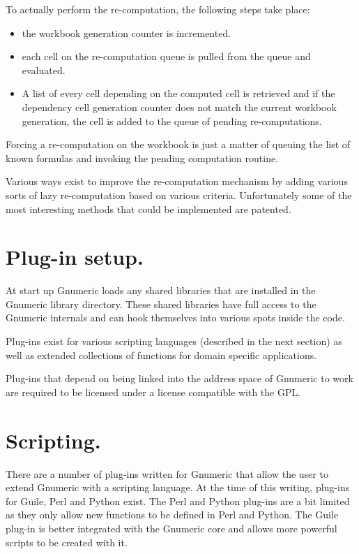 \documentclass[12pt,twoside,twocolumn]{article}
\begin{document}
To actually perform the re-computation, the following steps take place:

\begin{itemize}

	\item the workbook generation counter is incremented.
	
	\item each cell on the re-computation queue is pulled from the
	queue and evaluated.

	\item A list of every cell depending on the computed cell is
	retrieved and if the dependency cell generation counter does
	not match the current workbook generation, the cell is added
	to the queue of pending re-computations.

\end{itemize}

Forcing a re-computation on the workbook is just a matter of queuing the
list of known formulas and invoking the pending computation routine. 

Various ways exist to improve the re-computation mechanism by adding
various sorts of lazy re-computation based on various criteria.
Unfortunately some of the most interesting methods that could be
implemented are patented.


\section{Plug-in setup.}

At start up Gnumeric loads any shared libraries that are installed in
the Gnumeric library directory.  These shared libraries have full
access to the Gnumeric internals and can hook themselves into various
spots inside the code.  

Plug-ins exist for various scripting languages (described in the next
section) as well as extended collections of functions for domain
specific applications. 

Plug-ins that depend on being linked into the address space of
Gnumeric to work are required to be licensed under a license
compatible with the GPL.  


\section{Scripting.}

There are a number of plug-ins written for Gnumeric that allow the user
to extend Gnumeric with a scripting language.  At the time of this
writing, plug-ins for Guile, Perl and Python exist.  The Perl and
Python plug-ins are a bit limited as they only allow new functions to
be defined in Perl and Python.  The Guile plug-in is better integrated
with the Gnumeric core and allows more powerful scripts to be created
with it. 
\end{document}
